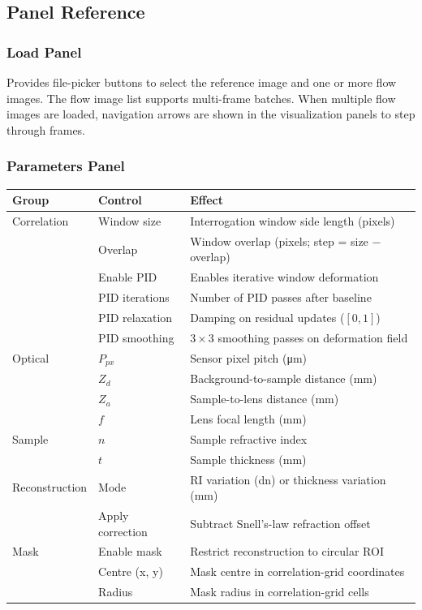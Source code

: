 \documentclass[11pt]{article}
\begin{document}
\subsection{Panel Reference}

\subsubsection{Load Panel}

Provides file-picker buttons to select the reference image and one or
more flow images. The flow image list supports multi-frame batches.
When multiple flow images are loaded, navigation arrows are shown in
the visualization panels to step through frames.

\subsubsection{Parameters Panel}

\begin{center}
\begin{tabular}{lll}
  \toprule
  \rowcolor{accentlight} Group & Control & Effect \\
  \midrule
  Correlation & Window size & Interrogation window side length (pixels) \\
              & Overlap     & Window overlap (pixels; step = size $-$ overlap) \\
              & Enable PID  & Enables iterative window deformation \\
              & PID iterations & Number of PID passes after baseline \\
              & PID relaxation & Damping on residual updates ($[0,1]$) \\
              & PID smoothing  & $3{\times}3$ smoothing passes on deformation field \\
  \midrule
  Optical     & $P_{px}$       & Sensor pixel pitch (\si{\micro\metre}) \\
              & $Z_d$          & Background-to-sample distance (\si{mm}) \\
              & $Z_a$          & Sample-to-lens distance (\si{mm}) \\
              & $f$            & Lens focal length (\si{mm}) \\
  \midrule
  Sample      & $n$            & Sample refractive index \\
              & $t$            & Sample thickness (\si{mm}) \\
  \midrule
  Reconstruction & Mode        & RI variation (dn) or thickness variation (mm) \\
                 & Apply correction & Subtract Snell's-law refraction offset \\
  \midrule
  Mask        & Enable mask    & Restrict reconstruction to circular ROI \\
              & Centre (x, y)  & Mask centre in correlation-grid coordinates \\
              & Radius         & Mask radius in correlation-grid cells \\
  \bottomrule
\end{tabular}
\end{center}
\end{document}

